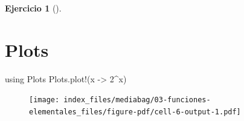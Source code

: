 \documentclass[
  a4paper,
]{scrreport}
\newenvironment{Shaded}{\begin{snugshade}}{\end{snugshade}}
\newcommand{\BuiltInTok}[1]{\textcolor[rgb]{0.00,0.23,0.31}{#1}}
\newcommand{\FloatTok}[1]{\textcolor[rgb]{0.68,0.00,0.00}{#1}}
\newcommand{\FunctionTok}[1]{\textcolor[rgb]{0.28,0.35,0.67}{#1}}
\newcommand{\ImportTok}[1]{\textcolor[rgb]{0.00,0.46,0.62}{#1}}
\newcommand{\NormalTok}[1]{\textcolor[rgb]{0.00,0.23,0.31}{#1}}
\newcommand{\OperatorTok}[1]{\textcolor[rgb]{0.37,0.37,0.37}{#1}}
\theoremstyle{definition}
\newtheorem{exercise}{Ejercicio}[chapter]
\theoremstyle{remark}
\begin{document}
\begin{exercise}[]
\begin{tcolorbox}
\begin{figure}[H]
{}

\end{figure}

\section{Plots}

\begin{Shaded}
\begin{Highlighting}[]
\ImportTok{using} \BuiltInTok{Plots}
\NormalTok{Plots.}\FunctionTok{plot!}\NormalTok{(x }\OperatorTok{{-}\textgreater{}} \FloatTok{2}\OperatorTok{\^{}}\NormalTok{x)}
\end{Highlighting}
\end{Shaded}

\begin{figure}[H]

{\centering \texttt{[image: index\_files/mediabag/03-funciones-elementales\_files/figure-pdf/cell-6-output-1.pdf]}

}

\end{figure}

\end{tcolorbox}

\end{exercise}
\end{document}
